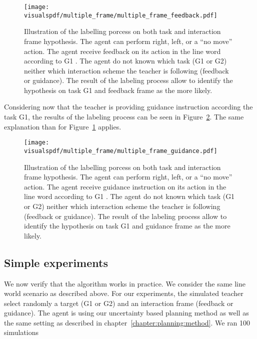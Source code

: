 \begin{figure}[!htbp]
\centering
\texttt{[image: \\visualspdf/multiple\_frame/multiple\_frame\_feedback.pdf]}
\caption{Illustration of the labelling porcess on both task and interaction frame hypothesis. The agent can perform right, left, or a ``no move'' action. The agent receive feedback on its action in the line word according to G1 . The agent do not known which task (G1 or G2) neither which interaction scheme the teacher is following (feedback or guidance). The result of the labeling process allow to identify the hypothesis on task G1 and feedback frame as the more likely.}
\label{fig:multipleframeexplainedfeedback}
\end{figure} 

Considering now that the teacher is providing guidance instruction according the task G1, the results of the labeling process can be seen in Figure~\ref{fig:multipleframeexplainedguidance}. The same explanation than for Figure~\ref{fig:multipleframeexplainedfeedback} applies. 

\begin{figure}[!htbp]
\centering
\texttt{[image: \\visualspdf/multiple\_frame/multiple\_frame\_guidance.pdf]}
\caption{Illustration of the labelling porcess on both task and interaction frame hypothesis. The agent can perform right, left, or a ``no move'' action. The agent receive guidance instruction on its action in the line word according to G1 . The agent do not known which task (G1 or G2) neither which interaction scheme the teacher is following (feedback or guidance). The result of the labeling process allow to identify the hypothesis on task G1 and guidance frame as the more likely.}
\label{fig:multipleframeexplainedguidance}
\end{figure} 

\subsection{Simple experiments}

We now verify that the algorithm works in practice. We consider the same line world scenario as described above. For our experiments, the simulated teacher select randomly a target (G1 or G2) and an interaction frame (feedback or guidance). The agent is using our uncertainty based planning method as well as the same setting as described in chapter~\ref{chapter:planning:method}. We ran 100 simulations

